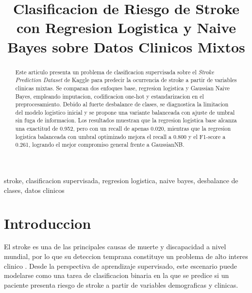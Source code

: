 \documentclass[conference]{IEEEtran}
\begin{document}
\title{Clasificacion de Riesgo de Stroke con Regresion Logistica y Naive Bayes sobre Datos Clinicos Mixtos}

\author{
}

\maketitle

\begin{abstract}
Este articulo presenta un problema de clasificacion supervisada sobre el \textit{Stroke Prediction Dataset} de Kaggle \cite{b1} para predecir la ocurrencia de stroke a partir de variables clinicas mixtas. Se comparan dos enfoques base, regresion logistica y Gaussian Naive Bayes, empleando imputacion, codificacion one-hot y estandarizacion en el preprocesamiento. Debido al fuerte desbalance de clases, se diagnostica la limitacion del modelo logistico inicial y se propone una variante balanceada con ajuste de umbral sin fuga de informacion. Los resultados muestran que la regresion logistica base alcanza una exactitud de 0.952, pero con un recall de apenas 0.020, mientras que la regresion logistica balanceada con umbral optimizado mejora el recall a 0.800 y el F1-score a 0.261, logrando el mejor compromiso general frente a GaussianNB.
\end{abstract}

\begin{IEEEkeywords}
stroke, clasificacion supervisada, regresion logistica, naive bayes, desbalance de clases, datos clinicos
\end{IEEEkeywords}

\section{Introduccion}
El stroke es una de las principales causas de muerte y discapacidad a nivel mundial, por lo que su deteccion temprana constituye un problema de alto interes clinico \cite{b4}. Desde la perspectiva de aprendizaje supervisado, este escenario puede modelarse como una tarea de clasificacion binaria en la que se predice si un paciente presenta riesgo de stroke a partir de variables demograficas y clinicas.
\end{document}
